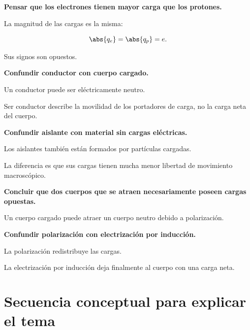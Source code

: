 \begin{errorfrecuente}
\textbf{Pensar que los electrones tienen mayor carga que los protones.}

La magnitud de las cargas es la misma:

\[
\abs{q_e}
=
\abs{q_p}
=
e.
\]

Sus signos son opuestos.
\end{errorfrecuente}


\begin{errorfrecuente}
\textbf{Confundir conductor con cuerpo cargado.}

Un conductor puede ser eléctricamente neutro.

Ser conductor describe la movilidad de los portadores de carga, no la carga
neta del cuerpo.
\end{errorfrecuente}


\begin{errorfrecuente}
\textbf{Confundir aislante con material sin cargas eléctricas.}

Los aislantes también están formados por partículas cargadas.

La diferencia es que sus cargas tienen mucha menor libertad de movimiento
macroscópico.
\end{errorfrecuente}


\begin{errorfrecuente}
\textbf{Concluir que dos cuerpos que se atraen necesariamente poseen cargas
opuestas.}

Un cuerpo cargado puede atraer un cuerpo neutro debido a polarización.
\end{errorfrecuente}


\begin{errorfrecuente}
\textbf{Confundir polarización con electrización por inducción.}

La polarización redistribuye las cargas.

La electrización por inducción deja finalmente al cuerpo con una carga neta.
\end{errorfrecuente}



\section{Secuencia conceptual para explicar el tema}

